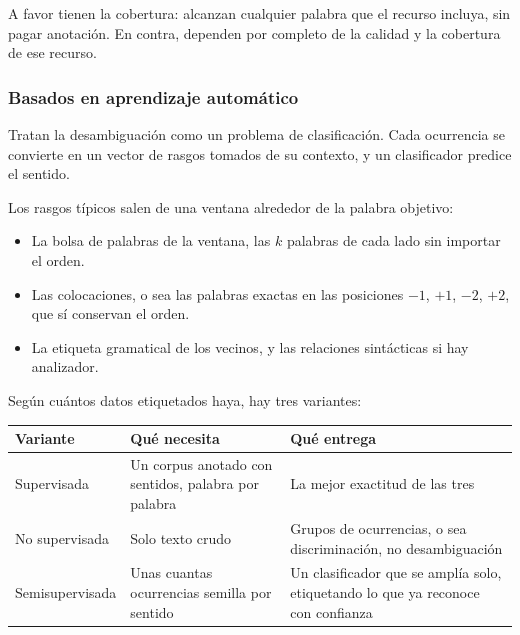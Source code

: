 \documentclass[11pt,letterpaper]{article}
\begin{document}
A favor tienen la cobertura: alcanzan cualquier palabra que el
recurso incluya, sin pagar anotación. En contra, dependen por
completo de la calidad y la cobertura de ese recurso.

\subsubsection*{Basados en aprendizaje automático}

Tratan la desambiguación como un problema de clasificación. Cada
ocurrencia se convierte en un vector de rasgos tomados de su
contexto, y un clasificador predice el sentido.

Los rasgos típicos salen de una ventana alrededor de la palabra
objetivo:

\begin{itemize}[itemsep=0.2em]
    \item La bolsa de palabras de la ventana, las $k$ palabras de
          cada lado sin importar el orden.
    \item Las colocaciones, o sea las palabras exactas en las
          posiciones $-1$, $+1$, $-2$, $+2$, que sí conservan el
          orden.
    \item La etiqueta gramatical de los vecinos, y las relaciones
          sintácticas si hay analizador.
\end{itemize}

Según cuántos datos etiquetados haya, hay tres variantes:

\begin{center}
\begin{tabular}{>{\raggedright\arraybackslash}p{3.0cm}
                >{\raggedright\arraybackslash}p{5.0cm}
                >{\raggedright\arraybackslash}p{5.0cm}}
    \toprule
    \textbf{Variante} & \textbf{Qué necesita} & \textbf{Qué entrega}
    \\
    \midrule
    Supervisada &
    Un corpus anotado con sentidos, palabra por palabra &
    La mejor exactitud de las tres \\
    \addlinespace
    No supervisada &
    Solo texto crudo &
    Grupos de ocurrencias, o sea discriminación, no
    desambiguación \\
    \addlinespace
    Semisupervisada &
    Unas cuantas ocurrencias semilla por sentido &
    Un clasificador que se amplía solo, etiquetando lo que ya
    reconoce con confianza \\
    \bottomrule
\end{tabular}
\end{center}
\end{document}
